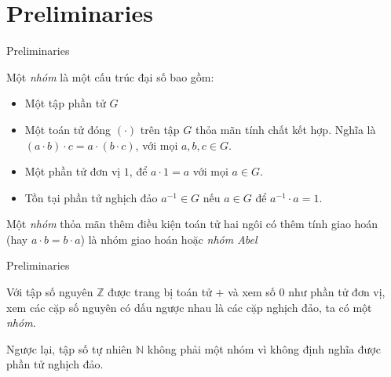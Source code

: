 \documentclass [xcolor=svgnames, t] {beamer}
\theoremstyle{definition}
\begin{document}
\section{Preliminaries}
\begin{frame}{Preliminaries}
    \cite{Vishwanath10}
    \begin{definition}
        \label{define:2.1}
        Một \textit{nhóm} là một cấu trúc đại số bao gồm:
        \begin{itemize}
            \item Một tập phần tử $G$
            \item Một toán tử đóng $(\cdot)$ trên tập $G$ thỏa mãn tính chất kết hợp. Nghĩa là $(a \cdot b) \cdot c  = a \cdot (b \cdot c)$, với mọi $a, b, c \in G$.
            \item Một phần tử đơn vị $1$, để $a \cdot 1 = a$ với mọi $a \in G$.
            \item Tồn tại phần tử nghịch đảo $a^{-1} \in G$ nếu $a \in G$ để $a^{-1} \cdot a = 1$.
        \end{itemize}

        Một \textit{nhóm} thỏa mãn thêm điều kiện toán tử hai ngôi có thêm tính giao hoán (hay $a \cdot b = b \cdot a$) là nhóm giao hoán hoặc \textit{nhóm Abel}
    \end{definition}
\end{frame}
\begin{frame}{Preliminaries}
    \begin{example}
        Với tập số nguyên $\mathbb{Z}$ được trang bị toán tử $+$ và xem số $0$ như phần tử đơn vị,
        xem các cặp số nguyên có dấu ngược nhau là các cặp nghịch đảo, ta có một \textit{nhóm}.

        Ngược lại, tập số tự nhiên $\mathbb{N}$ không phải một nhóm vì không định nghĩa được phần tử nghịch đảo.
    \end{example}
\end{frame}
\end{document}

